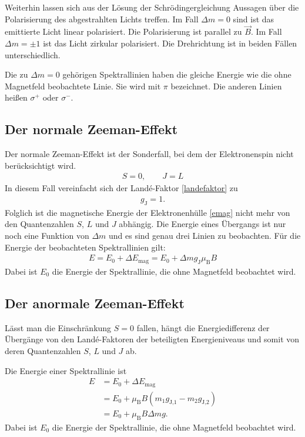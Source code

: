 Weiterhin lassen sich aus der Lösung der Schrödingergleichung Aussagen über die Polarisierung des abgestrahlten Lichts treffen.
Im Fall $\Delta m = 0$ sind ist das emittierte Licht linear polarisiert.
Die Polarisierung ist parallel zu $\vec{B}$.
Im Fall $\Delta m = \pm 1$ ist das Licht zirkular polarisiert.
Die Drehrichtung ist in beiden Fällen unterschiedlich.

Die zu $\Delta m = 0$ gehörigen Spektrallinien haben die gleiche Energie wie die ohne Magnetfeld beobachtete Linie.
Sie wird mit $\pi$ bezeichnet.
Die anderen Linien heißen $\sigma^+$ oder $\sigma^-$.

\subsection{Der normale Zeeman-Effekt}
Der normale Zeeman-Effekt ist der Sonderfall, bei dem der Elektronenspin nicht berücksichtigt wird.
\begin{align}
	S = 0, \quad \quad J = L
\end{align}
In diesem Fall vereinfacht sich der Landé-Faktor \eqref{landefaktor} zu
\begin{align}
	g_\text{J} = 1.
\end{align}
Folglich ist die magnetische Energie der Elektronenhülle \eqref{emag} nicht mehr von den Quantenzahlen $S$, $L$ und $J$ abhängig.
Die Energie eines Übergangs ist nur noch eine Funktion von $\Delta m$ und es sind genau drei Linien zu beobachten.
Für die Energie der beobachteten Spektrallinien gilt:
\begin{align}
	\label{e_normal}
	E = E_0 + \Delta E_\text{mag} =  E_0 + \Delta m g_\text{J} \mu_\text{B} B
\end{align}
Dabei ist $E_0$ die Energie der Spektrallinie, die ohne Magnetfeld beobachtet wird.

\subsection{Der anormale Zeeman-Effekt}
Lässt man die Einschränkung $S = 0$ fallen, hängt die Energiedifferenz der Übergänge von den Landé-Faktoren der beteiligten Energieniveaus und somit von deren Quantenzahlen $S$, $L$ und $J$ ab.

Die Energie einer Spektrallinie ist
\begin{align}
	E &= E_0 + \Delta E_\text{mag} \\
	&= E_0 + \mu_\text{B} B \left(m_1 g_\text{J,1} - m_2 g_\text{J,2} \right) \\
	&= E_0 + \mu_\text{B} B \Delta mg.
\end{align}
Dabei ist $E_0$ die Energie der Spektrallinie, die ohne Magnetfeld beobachtet wird.

